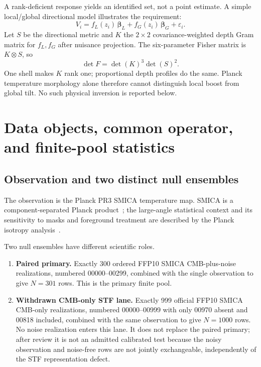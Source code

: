 \documentclass[11pt,a4paper]{article}
\begin{document}
A rank-deficient response yields an identified set, not a point estimate.  A
simple local/global directional model illustrates the requirement:
\begin{equation}
V_i=f_L(z_i)\,\boldsymbol\beta_L
   +f_G(z_i)\,\boldsymbol\beta_G+\varepsilon_i.
\label{eq:local-global}
\end{equation}
Let $S$ be the directional metric and $K$ the $2\times2$ covariance-weighted
depth Gram matrix for $f_L,f_G$ after nuisance projection.  The six-parameter
Fisher matrix is $K\otimes S$, so
\begin{equation}
\det F=\det(K)^3\det(S)^2.
\label{eq:fisher-factor}
\end{equation}
One shell makes $K$ rank one; proportional depth profiles do the same.  Planck
temperature morphology alone therefore cannot distinguish local boost from
global tilt.  No such physical inversion is reported below.

\section{Data objects, common operator, and finite-pool statistics}

\subsection{Observation and two distinct null ensembles}

The observation is the Planck PR3 SMICA temperature map.  SMICA is a
component-separated Planck product~\cite{Planck2018IV}; the large-angle
statistical context and its sensitivity to masks and foreground treatment are
described by the Planck isotropy analysis~\cite{Planck2018VII}.

Two null ensembles have different scientific roles.
\begin{enumerate}[leftmargin=*]
  \item \textbf{Paired primary.}  Exactly 300 ordered FFP10 SMICA
  CMB-plus-noise realizations, numbered 00000--00299, combined with the single
  observation to give $N=301$ rows.  This is the primary finite pool.
  \item \textbf{Withdrawn CMB-only STF lane.}  Exactly 999 official FFP10 SMICA
  CMB-only realizations, numbered 00000--00999 with only 00970 absent and 00818
  included, combined with the same observation to give $N=1000$ rows.  No
  noise realization enters this lane.  It does not replace the paired primary;
  after review it is not an admitted calibrated test because the noisy
  observation and noise-free rows are not jointly exchangeable, independently
  of the STF representation defect.
\end{enumerate}
\end{document}
